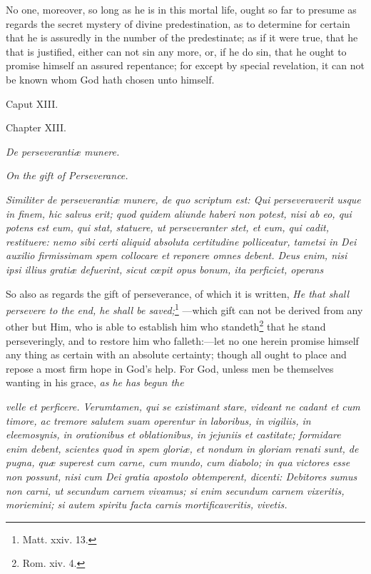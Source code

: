No one, moreover, so long as he is in this mortal life, ought so far to presume as regards the secret mystery of divine predestination, as to determine for certain that he is assuredly in the number of the predestinate; as if it were true, that he that is justified, either can not sin any more, or, if he do sin, that he ought to promise himself an assured repentance; for except by special revelation, it can not be known whom God hath chosen unto himself.

Caput XIII.

Chapter XIII.

\emph{De perseverantiæ munere.}

\emph{On the gift of Perseverance.}

\emph{Similiter de perseverantiæ munere, de quo scriptum est: Qui perseveraverit usque in finem, hic salvus erit; quod quidem aliunde haberi non potest, nisi ab eo, qui potens est eum, qui stat, statuere, ut perseveranter stet, et eum, qui cadit, restituere: nemo sibi certi aliquid absoluta certitudine polliceatur, tametsi in Dei auxilio firmissimam spem collocare et reponere omnes debent. Deus enim, nisi ipsi illius gratiæ defuerint, sicut cœpit opus bonum, ita perficiet, operans }

So also as regards the gift of perseverance, of which it is written, \emph{He that shall persevere to the end, he shall be saved;}\footnote{\par   Matt. xxiv. 13.} —which gift can not be derived from any other but Him, who is able to establish him who standeth\footnote{\par   Rom. xiv. 4.} that he stand perseveringly, and to restore him who falleth:—let no one herein promise himself any thing as certain with an absolute certainty; though all ought to place and repose a most firm hope in God's help. For God, unless men be themselves wanting in his grace, \emph{as he has begun the}

\emph{velle et perficere. Verumtamen, qui se existimant stare, videant ne cadant et cum timore, ac tremore salutem suam operentur in laboribus, in vigiliis, in eleemosynis, in orationibus et oblationibus, in jejuniis et castitate; formidare enim debent, scientes quod in spem gloriæ, et nondum in gloriam renati sunt, de pugna, quæ superest cum carne, cum mundo, cum diabolo; in qua victores esse non possunt, nisi cum Dei gratia apostolo obtemperent, dicenti: Debitores sumus non carni, ut secundum carnem vivamus; si enim secundum carnem vixeritis, moriemini; si autem spiritu facta carnis mortificaveritis, vivetis.}

